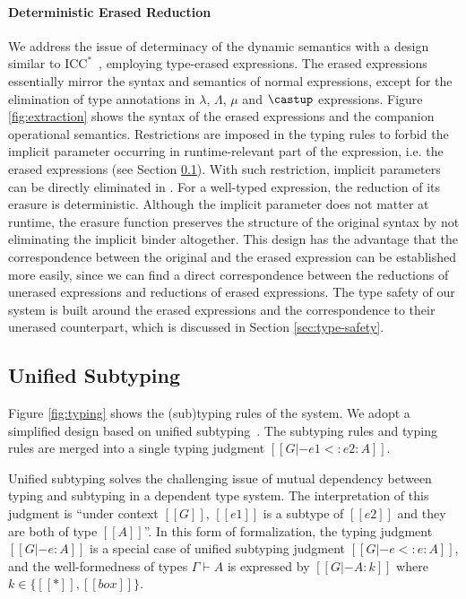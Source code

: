 \paragraph{Deterministic Erased Reduction}
We address the issue of determinacy of the dynamic semantics with
a design similar to $\mathrm{ICC}^*$~\cite{barras2008implicit},
employing type-erased expressions. The erased expressions
essentially mirror the syntax and semantics
of normal expressions, except for the elimination of type annotations in $\lambda$,
$\Lambda$, $\mu$ and $\castup$ expressions.
Figure \ref{fig:extraction} shows the syntax of the erased expressions and
the companion operational semantics. Restrictions are imposed in the
typing rules to forbid the implicit parameter occurring in runtime-relevant part
of the expression, i.e. the erased expressions (see Section \ref{sec:type-system}).
With such restriction, implicit parameters can be directly eliminated in
.
For a well-typed expression, the reduction of
its erasure is deterministic.
Although the implicit parameter does not matter at runtime, the erasure
function preserves the structure of the original syntax
by not eliminating the implicit binder altogether. This design
has the advantage that the correspondence
between the original and the erased expression can be established more easily,
since we can find a direct correspondence between
the reductions of unerased expressions and reductions of erased expressions.
The type safety of our system is built around the erased expressions and the
correspondence to their unerased counterpart, which is discussed in Section \ref{sec:type-safety}.

\subsection{Unified Subtyping}
\label{sec:type-system}

Figure \ref{fig:typing} shows the (sub)typing rules of the system. We adopt a
simplified design based on unified subtyping~\cite{full}. The subtyping rules and
typing rules are merged into a single typing judgment $[[G |- e1 <: e2 : A]]$.

Unified subtyping solves the challenging issue of mutual dependency between typing
and subtyping in a dependent type system.
The interpretation of this judgment is ``under context $[[G]]$, $[[e1]]$ is a
subtype of $[[e2]]$ and they are both of type $[[A]]$''.
In this form of formalization, the typing judgment $[[G |- e : A]]$ is a
special case of unified subtyping judgment $[[G |- e <: e : A]]$,
and the well-formedness of types $\Gamma \vdash A$ is expressed by
$[[G |- A : k]]$ where $k \in \{[[*]], [[box]]\}$.

